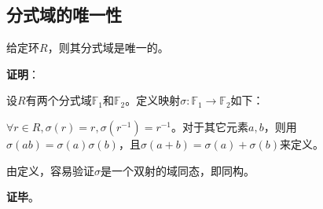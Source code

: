 \subsection{分式域的唯一性}

\begin{theorem}{}\label{the_FrcFld_1}
给定环$R$，则其分式域是唯一的。
\end{theorem}

\textbf{证明}：

设$R$有两个分式域$\mathbb{F}_1$和$\mathbb{F}_2$。定义映射$\sigma:\mathbb{F}_1\to\mathbb{F}_2$如下：

$\forall r\in R, \sigma(r)=r, \sigma(r^{-1})=r^{-1}$。对于其它元素$a, b$，则用$\sigma(ab)=\sigma(a)\sigma(b)$，且$\sigma(a+b)=\sigma(a)+\sigma(b)$来定义。

由定义，容易验证$\sigma$是一个双射的域同态，即同构。

\textbf{证毕}。













